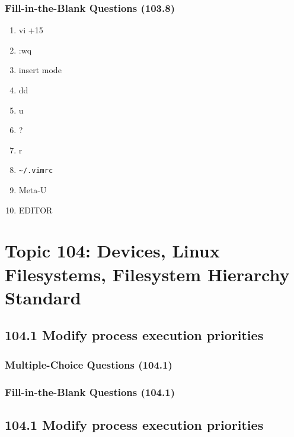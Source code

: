 \documentclass[a4paper]{report}
\begin{document}
\subsubsection*{Fill-in-the-Blank Questions (103.8)}
\begin{enumerate}[1.]
    \item vi +15
    \item :wq
    \item insert mode
    \item dd
    \item u
    \item ?
    \item r
    \item \texttt{\textasciitilde/.vimrc}
    \item Meta-U
    \item EDITOR
\end{enumerate}

\section*{Topic 104: Devices, Linux Filesystems, Filesystem Hierarchy Standard}

\subsection*{104.1 Modify process execution priorities}
\subsubsection*{Multiple-Choice Questions (104.1)}

\subsubsection*{Fill-in-the-Blank Questions (104.1)}

\subsection*{104.1 Modify process execution priorities}
\end{document}
